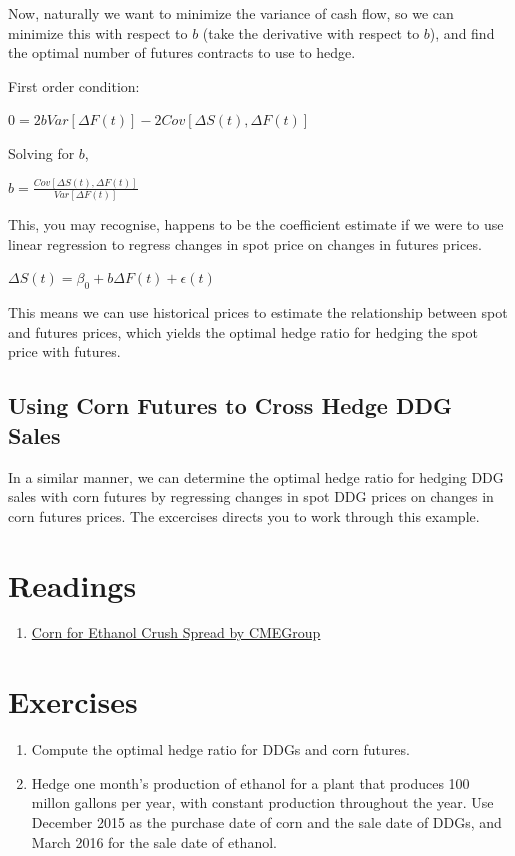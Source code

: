 \documentclass[]{book}
\providecommand{\tightlist}{%
  \setlength{\itemsep}{0pt}\setlength{\parskip}{0pt}}
\theoremstyle{definition}
\theoremstyle{definition}
\theoremstyle{remark}
\begin{document}
Now, naturally we want to minimize the variance of cash flow, so we can
minimize this with respect to \(b\) (take the derivative with respect to
\(b\)), and find the optimal number of futures contracts to use to
hedge.

First order condition:

\(0 = 2bVar[\Delta F(t)] - 2Cov[\Delta S(t),\Delta F(t)]\)

Solving for \(b\),

\(b = \frac{Cov[\Delta S(t),\Delta F(t)]}{Var[\Delta F(t)]}\)

This, you may recognise, happens to be the coefficient estimate if we
were to use linear regression to regress changes in spot price on
changes in futures prices.

\(\Delta S(t) = \beta_0 + b\Delta F(t) + \epsilon(t)\)

This means we can use historical prices to estimate the relationship
between spot and futures prices, which yields the optimal hedge ratio
for hedging the spot price with futures.

\subsection{Using Corn Futures to Cross Hedge DDG
Sales}\label{using-corn-futures-to-cross-hedge-ddg-sales}

In a similar manner, we can determine the optimal hedge ratio for
hedging DDG sales with corn futures by regressing changes in spot DDG
prices on changes in corn futures prices. The excercises directs you to
work through this example.

\section{Readings}\label{readings-5}

\begin{enumerate}
\def\labelenumi{\arabic{enumi}.}
\tightlist
\item
  \href{http://www.cmegroup.com/trading/agricultural/files/AC-406_DDG_CornCrush_042010.pdf}{Corn
  for Ethanol Crush Spread by CMEGroup}
\end{enumerate}

\section{Exercises}\label{exercises-5}

\begin{enumerate}
\def\labelenumi{\arabic{enumi}.}
\tightlist
\item
  Compute the optimal hedge ratio for DDGs and corn futures.
\item
  Hedge one month's production of ethanol for a plant that produces 100
  millon gallons per year, with constant production throughout the year.
  Use December 2015 as the purchase date of corn and the sale date of
  DDGs, and March 2016 for the sale date of ethanol.
\end{enumerate}
\end{document}
